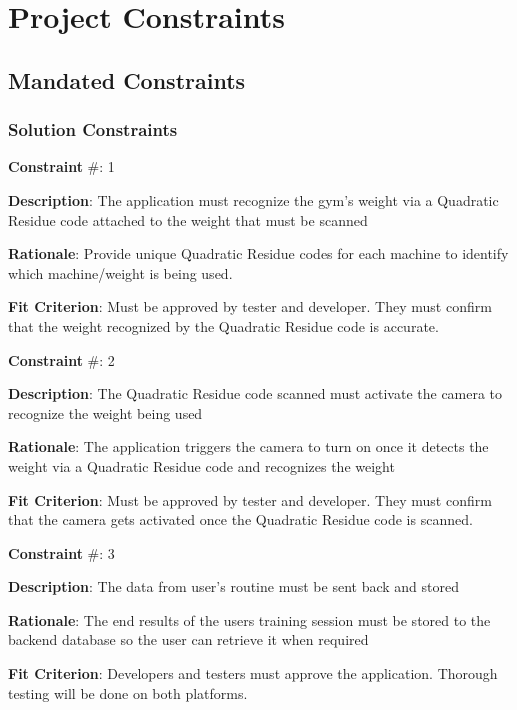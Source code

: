\documentclass{article}
\begin{document}
\newpage
\section{Project Constraints}

\subsection{Mandated Constraints}
\subsubsection{Solution Constraints}
\textbf{Constraint} \#: 1
\raggedright

\textbf{Description}: The application must recognize the gym’s weight via a Quadratic Residue code attached to the weight that must be scanned

\textbf{Rationale}: Provide unique Quadratic Residue codes for each machine to identify which machine/weight is being used. %

\textbf{Fit Criterion}: Must be approved by tester and developer. They must confirm that the weight recognized by the Quadratic Residue code is accurate.

\medskip

\textbf{Constraint} \#: 2

\textbf{Description}: The Quadratic Residue code scanned must activate the camera to recognize the weight being used

\textbf{Rationale}: The application triggers the camera to turn on once it detects the weight via a Quadratic Residue code and recognizes the weight

\textbf{Fit Criterion}: Must be approved by tester and developer. They must confirm that the camera gets activated once the Quadratic Residue code is scanned. 

\medskip

\textbf{Constraint} \#: 3

\textbf{Description}: The data from user’s routine must be sent back and stored

\textbf{Rationale}: The end results of the users training session must be stored to the backend database so the user can retrieve it when required

\textbf{Fit Criterion}: Developers and testers must approve the application. Thorough testing will be done on both platforms.
\end{document}
